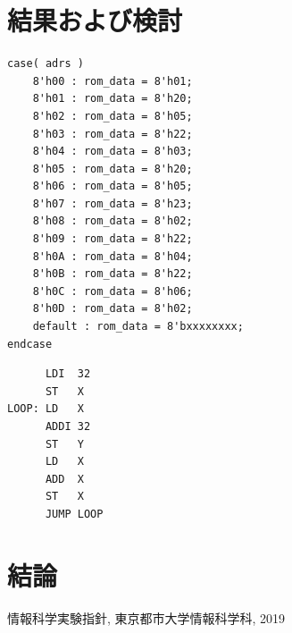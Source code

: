 \documentclass[a4j]{jarticle}
\begin{document}
\section{結果および検討}

\begin{verbatim}
case( adrs )
    8'h00 : rom_data = 8'h01;
    8'h01 : rom_data = 8'h20;
    8'h02 : rom_data = 8'h05;
    8'h03 : rom_data = 8'h22;
    8'h04 : rom_data = 8'h03;
    8'h05 : rom_data = 8'h20;
    8'h06 : rom_data = 8'h05;
    8'h07 : rom_data = 8'h23;
    8'h08 : rom_data = 8'h02;
    8'h09 : rom_data = 8'h22;
    8'h0A : rom_data = 8'h04;
    8'h0B : rom_data = 8'h22;
    8'h0C : rom_data = 8'h06;
    8'h0D : rom_data = 8'h02;
    default : rom_data = 8'bxxxxxxxx;
endcase
\end{verbatim}

\begin{verbatim}
      LDI  32
      ST   X
LOOP: LD   X
      ADDI 32
      ST   Y
      LD   X
      ADD  X
      ST   X
      JUMP LOOP
\end{verbatim}

\section{結論}

\begin{thebibliography}{9}
     情報科学実験指針, 東京都市大学情報科学科, 2019
\end{thebibliography}



\end{document}
